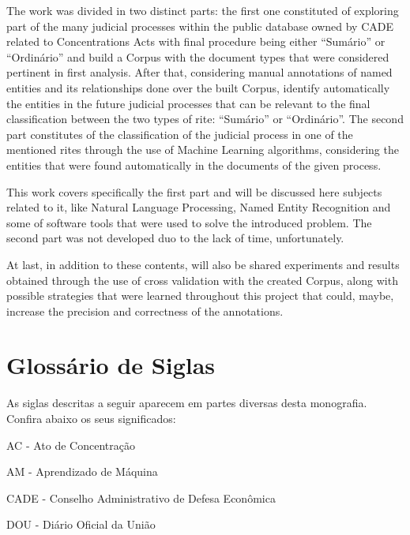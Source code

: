 \documentclass[11pt]{report}
\newcommand{\quotes}[1]{``#1''}
\begin{document}
The work was divided in two distinct parts: the first one constituted of exploring part of the many judicial processes within the public database owned by CADE related to Concentrations
Acts with final procedure being either \quotes{Sumário} or \quotes{Ordinário} and build a Corpus with the document types that were considered pertinent in first analysis. After that,
considering manual annotations of named entities and its relationships done over the built Corpus, identify automatically the entities in the future judicial processes that can be relevant
to the final classification between the two types of rite: \quotes{Sumário} or \quotes{Ordinário}. The second part constitutes of the classification of the judicial process in one of
the mentioned rites through the use of Machine Learning algorithms, considering the entities that were found automatically in the documents of the given process.

This work covers specifically the first part and will be discussed here subjects related to it, like Natural Language Processing, Named Entity Recognition and some of software tools that
were used to solve the introduced problem. The second part was not developed duo to the lack of time, unfortunately.

At last, in addition to these contents, will also be shared experiments and results obtained through the use of cross validation with the created Corpus, along with possible strategies that
were learned throughout this project that could, maybe, increase the precision and correctness of the annotations.

\pagebreak
\thispagestyle{empty}
\chapter*{Glossário de Siglas}

\indent\indent As siglas descritas a seguir aparecem em partes diversas desta monografia. Confira abaixo
os seus significados:

\vspace*{20px}

\noindent AC - Ato de Concentração

\vspace*{8px}
\noindent AM - Aprendizado de Máquina

\vspace*{8px}
\noindent CADE - Conselho Administrativo de Defesa Econômica

\vspace*{8px}
\noindent DOU - Diário Oficial da União
\end{document}
